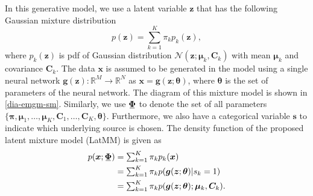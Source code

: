 In this generative model, we use a latent variable $\bm{z}$ that has the following Gaussian mixture distribution
\begin{equation}
  p(\bm{z}) = \sum_{k=1}^K \pi_k p_k(\bm{z}), %
\end{equation}
where $p_k(\bm{z})$ is pdf of Gaussian distribution $\mathcal{N}(\bm{z};\bm{\mu}_k,\bm{C}_k)$ with mean $\bm{\mu}_k$ and covariance $\bm{C}_k$.
The data $\bm{x}$ is
assumed to be generated in the model using a single neural network
$\bm{g}(\bm{z}): \mathbb{R}^M \rightarrow \mathbb{R}^N$ as
$\bm{x}=\bm{g}(\bm{z};\bm{\theta})$, where $\bm{\theta}$
is the set of parameters of the neural network. The diagram of this mixture model
is shown in \autoref{dia-emgm-sm}. Similarly, we use $\ubar{\bm{\Phi}}$ to denote the set of all parameters $\{ \bm{\pi},
\bm{\mu}_1,\hdots, \bm{\mu}_K, \bm{C}_1,\hdots,
\bm{C}_K, \bm{\theta} \}$. Furthermore, we also have a categorical variable $\bm{s}$ to indicate which underlying source is chosen. The density function of the proposed latent mixture model (LatMM) is given as
\begin{align}\label{eq:SecondMixtureModel}
  p(\bm{x};\ubar{\bm{\Phi}}) & = \textstyle\sum_{k=1}^K \pi_k p_k(\bm{x}) \nonumber\\
                             &= \textstyle\sum_{k=1}^K \pi_k  p(\bm{g}(\bm{z}; \bm{\theta})| s_k=1) \nonumber \\
                             & = \textstyle\sum_{k=1}^K \pi_k  p(\bm{g}(\bm{z};\bm{\theta}); \bm{\mu}_k, \bm{C}_k).
\end{align}
